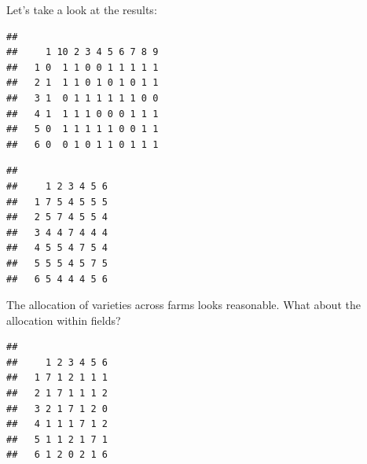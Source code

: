 \documentclass[
]{book}
\newenvironment{Shaded}{\begin{snugshade}}{\end{snugshade}}
\newcommand{\FunctionTok}[1]{\textcolor[rgb]{0.00,0.00,0.00}{#1}}
\newcommand{\NormalTok}[1]{#1}
\newcommand{\SpecialCharTok}[1]{\textcolor[rgb]{0.00,0.00,0.00}{#1}}
\begin{document}
Let's take a look at the results:

\begin{Shaded}
\end{Shaded}

\begin{verbatim}
##    
##     1 10 2 3 4 5 6 7 8 9
##   1 0  1 1 0 0 1 1 1 1 1
##   2 1  1 1 0 1 0 1 0 1 1
##   3 1  0 1 1 1 1 1 1 0 0
##   4 1  1 1 1 0 0 0 1 1 1
##   5 0  1 1 1 1 1 0 0 1 1
##   6 0  0 1 0 1 1 0 1 1 1
\end{verbatim}

\begin{Shaded}
\end{Shaded}

\begin{verbatim}
##    
##     1 2 3 4 5 6
##   1 7 5 4 5 5 5
##   2 5 7 4 5 5 4
##   3 4 4 7 4 4 4
##   4 5 5 4 7 5 4
##   5 5 5 4 5 7 5
##   6 5 4 4 4 5 6
\end{verbatim}

The allocation of varieties across farms looks reasonable. What about the allocation within fields?

\begin{Shaded}
\end{Shaded}

\begin{verbatim}
##    
##     1 2 3 4 5 6
##   1 7 1 2 1 1 1
##   2 1 7 1 1 1 2
##   3 2 1 7 1 2 0
##   4 1 1 1 7 1 2
##   5 1 1 2 1 7 1
##   6 1 2 0 2 1 6
\end{verbatim}
\end{document}
